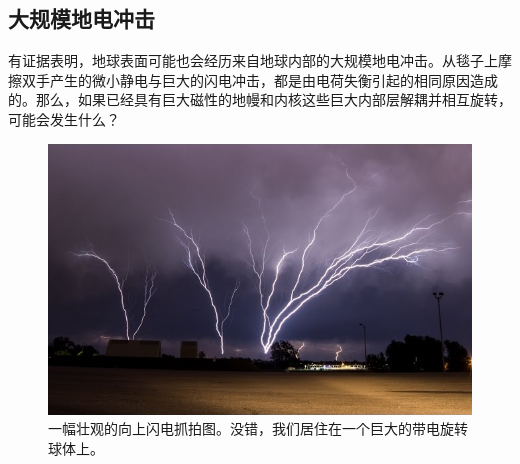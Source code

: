 \documentclass[10pt,twocolumn,letterpaper]{article}
\begin{document}
\subsection{大规模地电冲击}

有证据表明，地球表面可能也会经历来自地球内部的大规模地电冲击。从毯子上摩擦双手产生的微小静电与巨大的闪电冲击，都是由电荷失衡引起的相同原因造成的。那么，如果已经具有巨大磁性的地幔和内核这些巨大内部层解耦并相互旋转，可能会发生什么？

\begin{figure}[t]
\begin{center}
   \includegraphics[width=1\linewidth]{lightning.jpg}
\end{center}
   \caption{一幅壮观的向上闪电抓拍图。没错，我们居住在一个巨大的带电旋转球体上。 \cite{22}}
\label{fig:7}
\label{fig:onecol}
\end{figure}
\end{document}

